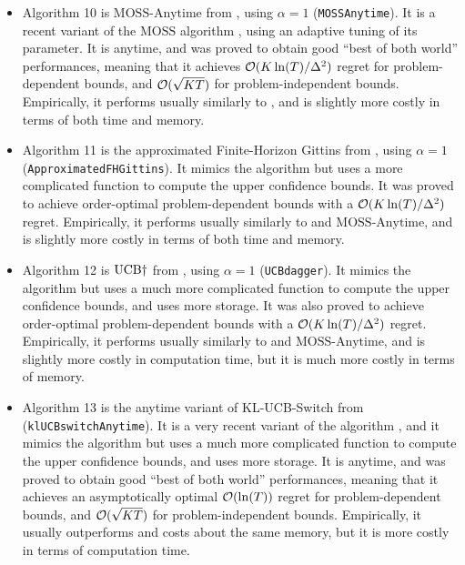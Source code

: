 \begin{itemize}
    \item Algorithm 10 is
    $\mathrm{MOSS}$-$\mathrm{Anytime}$ from \cite{Degenne16}, using $\alpha=1$ (\texttt{MOSSAnytime}).
    It is a recent variant of the $\mathrm{MOSS}$ algorithm \cite{BubeckSlivkins12}, using an adaptive tuning of its parameter. It is anytime, and was proved to obtain good ``best of both world'' performances, meaning that it achieves $\mathcal{O}(K\ln(T)/\Delta^2)$ regret for problem-dependent bounds, and $\mathcal{O}(\sqrt{KT})$ for problem-independent bounds.
    Empirically, it performs usually similarly to \UCB, and is slightly more costly in terms of both time and memory.

    \item Algorithm 11 is
    the approximated Finite-Horizon Gittins from \cite{Lattimore16a}, using $\alpha=1$ (\texttt{ApproximatedFHGittins}).
    It mimics the \UCB{} algorithm but uses a more complicated function to compute the upper confidence bounds.
    It was proved to achieve order-optimal problem-dependent bounds with a $\mathcal{O}(K\ln(T)/\Delta^2)$ regret.
    Empirically, it performs usually similarly to \UCB{} and $\mathrm{MOSS}$-$\mathrm{Anytime}$, and is slightly more costly in terms of both time and memory.

    \item Algorithm 12 is
    $\mathrm{UCB}\dagger$ from \cite{Lattimore2018refining}, using $\alpha=1$ (\texttt{UCBdagger}).
    It mimics the \UCB{} algorithm but uses a much more complicated function to compute the upper confidence bounds, and uses more storage.
    It was also proved to achieve order-optimal problem-dependent bounds with a $\mathcal{O}(K\ln(T)/\Delta^2)$ regret.
    Empirically, it performs usually similarly to \UCB{} and $\mathrm{MOSS}$-$\mathrm{Anytime}$, and is slightly more costly in computation time, but it is much more costly in terms of memory.

    \item Algorithm 13 is
    the anytime variant of KL-UCB-Switch from \cite{GarivierHadiji2018} (\texttt{klUCBswitchAnytime}).
    It is a very recent variant of the \klUCB{} algorithm \cite{KLUCBJournal},
    and it mimics the \klUCB{} algorithm but uses a much more complicated function to compute the upper confidence bounds, and uses more storage.
    It is anytime, and was proved to obtain good ``best of both world'' performances, meaning that it achieves an asymptotically optimal $\mathcal{O}(\ln(T))$ regret for problem-dependent bounds, and $\mathcal{O}(\sqrt{KT})$ for problem-independent bounds.
    Empirically, it usually outperforms \klUCB{} and costs about the same memory, but it is more costly in terms of computation time.


\end{itemize}
